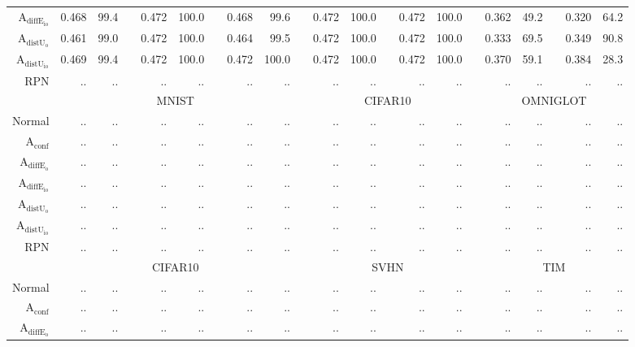 \begin{table}[ht]
\begin{tiny}
\begin{tabular}{@{}rrrcrrcrrcrrcrrcrrcrr@{}}
			$\mathrm{A}_{\mathrm{diffE_{io}}}$ & 0.468 & 99.4 & & 0.472 & 100.0 & & 0.468 & 99.6 & & 0.472 & 100.0 & & 0.472 & 100.0 & & 0.362 & 49.2 & & 0.320 & 64.2 \\
			$\mathrm{A}_{\mathrm{distU_{o}}}$  & 0.461 & 99.0 & & 0.472 & 100.0 & & 0.464 & 99.5 & & 0.472 & 100.0 & & 0.472 & 100.0 & & 0.333 & 69.5 & & 0.349 & 90.8 \\
			$\mathrm{A}_{\mathrm{distU_{io}}}$ & 0.469 & 99.4 & & 0.472 & 100.0 & & 0.472 & 100.0 & & 0.472 & 100.0 & & 0.472 & 100.0 & & 0.370 & 59.1 & & 0.384 & 28.3 \\
			RPN                                & .. & .. & & .. & .. & & .. & .. & & .. & .. & & .. & .. & & .. & .. & & .. & .. \\
			\midrule
			& \multicolumn{8}{c}{MNIST} & & \multicolumn{5}{c}{CIFAR10} & & \multicolumn{5}{c}{OMNIGLOT} \\
			Normal                             & .. & .. & & .. & .. & & .. & .. & & .. & .. & & .. & .. & & .. & .. & & .. & .. \\
			$\mathrm{A}_{\mathrm{conf}}$       & .. & .. & & .. & .. & & .. & .. & & .. & .. & & .. & .. & & .. & .. & & .. & .. \\
			$\mathrm{A}_{\mathrm{diffE_{o}}}$  & .. & .. & & .. & .. & & .. & .. & & .. & .. & & .. & .. & & .. & .. & & .. & .. \\
			$\mathrm{A}_{\mathrm{diffE_{io}}}$ & .. & .. & & .. & .. & & .. & .. & & .. & .. & & .. & .. & & .. & .. & & .. & .. \\
			$\mathrm{A}_{\mathrm{distU_{o}}}$  & .. & .. & & .. & .. & & .. & .. & & .. & .. & & .. & .. & & .. & .. & & .. & .. \\
			$\mathrm{A}_{\mathrm{distU_{io}}}$ & .. & .. & & .. & .. & & .. & .. & & .. & .. & & .. & .. & & .. & .. & & .. & .. \\
			RPN                                & .. & .. & & .. & .. & & .. & .. & & .. & .. & & .. & .. & & .. & .. & & .. & .. \\
			\midrule
			& \multicolumn{8}{c}{CIFAR10} & & \multicolumn{5}{c}{SVHN} & & \multicolumn{5}{c}{TIM} \\
			Normal                             & .. & .. & & .. & .. & & .. & .. & & .. & .. & & .. & .. & & .. & .. & & .. & .. \\
			$\mathrm{A}_{\mathrm{conf}}$       & .. & .. & & .. & .. & & .. & .. & & .. & .. & & .. & .. & & .. & .. & & .. & .. \\
			$\mathrm{A}_{\mathrm{diffE_{o}}}$  & .. & .. & & .. & .. & & .. & .. & & .. & .. & & .. & .. & & .. & .. & & .. & .. \\

\end{tabular}
\end{tiny}
\end{table}
